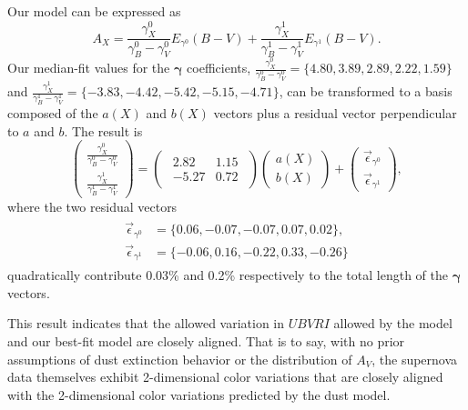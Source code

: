 \documentclass{aastex61}   	%
\begin{document}
Our model can be expressed as
\begin{equation}
A_X = \frac{\gamma^0_X}{\gamma^0_B-\gamma^0_V}  E_{\gamma^0}(B-V) +  \frac{\gamma^1_X}{\gamma^1_B-\gamma^1_V}  E_{\gamma^1}(B-V).
\end{equation}
Our median-fit values for the $\pmb{\gamma}$ coefficients,
$\frac{\gamma^0_X}{\gamma^0_B-\gamma^0_V}  =\{4.80 ,   3.89,   2.89,   2.22,   1.59\}$ and
$ \frac{\gamma^1_X}{\gamma^1_B-\gamma^1_V}=\{-3.83 ,  -4.42,  -5.42,  -5.15,  -4.71\}$,
can be transformed to a basis composed of the $a(X)$ and $b(X)$ vectors plus a residual vector perpendicular to $a$ and $b$.
The result is
\begin{equation}
\begin{pmatrix}
 \frac{\gamma^0_X}{\gamma^0_B-\gamma^0_V} \\
\frac{\gamma^1_X}{\gamma^1_B-\gamma^1_V} 
\end{pmatrix}=
\begin{pmatrix}
\begin{array}{rr}
2.82 & 1.15  \\
-5.27 & 0.72
\end{array}
\end{pmatrix} 
\begin{pmatrix}
a(X) \\
b(X)
\end{pmatrix}+
\begin{pmatrix}
\vec{\epsilon}_{\gamma^0} \\
\vec{\epsilon}_{\gamma^1}
\end{pmatrix},
\label{trans_I:eqn}
\end{equation}
where the two residual vectors
\begin{align}
\begin{split}
\vec{\epsilon}_{\gamma^0} &=\{0.06, -0.07, -0.07,  0.07, 0.02\}, \\
\vec{\epsilon}_{\gamma^1} & =\{-0.06, 0.16, -0.22, 0.33, -0.26\}
\end{split}
\label{res_I:eqn}
\end{align}
quadratically contribute  0.03\% and 0.2\% respectively to the total  length of the $\pmb{\gamma}$ vectors.


This result indicates that
the allowed variation in $UBVRI$ allowed by the  model and our best-fit model are closely aligned.
That is to say, with no prior assumptions of dust extinction behavior or the distribution of $A_V$, the supernova data themselves exhibit
2-dimensional color variations that are closely aligned with the 2-dimensional color variations predicted by the  dust model.
\end{document}
